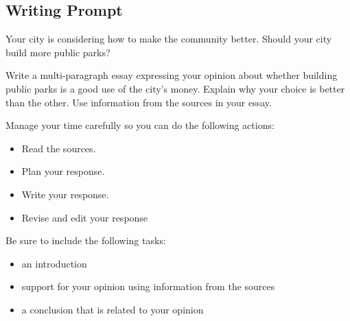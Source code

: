 \documentclass[12pt]{article}
\begin{document}
\vspace{1cm}


\subsection*{Writing Prompt}

\begin{spacing}{1.15}
    Your city is considering how to make the community better. Should your city build more public parks?

    Write a multi-paragraph essay expressing your opinion about whether building public parks is a good use of the city's money. Explain why your choice is better than the other. Use information from the sources in your essay.

    Manage your time carefully so you can do the following actions:
    \begin{itemize}
        \item Read the sources.
        \item Plan your response.
        \item Write your response.
        \item Revise and edit your response
    \end{itemize}

Be sure to include the following tasks:
\begin{itemize}
    \item an introduction
    \item support for your opinion using information from the sources
    \item a conclusion that is related to your opinion
\end{itemize}


\end{spacing}
\end{document}
